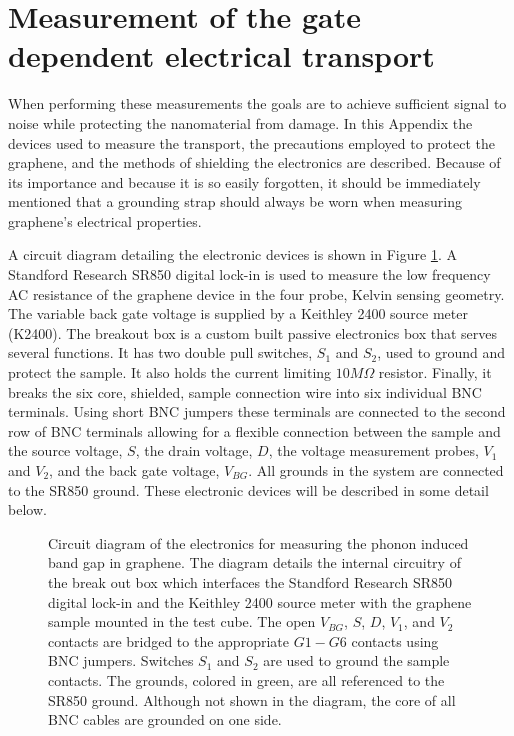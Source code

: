 \section{Measurement of the gate dependent electrical transport}
When performing these measurements the goals are to achieve sufficient signal to noise while protecting the nanomaterial from damage.
In this Appendix the devices used to measure the transport, the precautions employed to protect the graphene, and the methods of shielding the electronics are described.
Because of its importance and because it is so easily forgotten, it should be immediately mentioned that a grounding strap should always be worn when measuring graphene's electrical properties.

A circuit diagram detailing the electronic devices is shown in Figure \ref{fig:elec:wires}.
A Standford Research SR850 digital lock-in is used to measure the low frequency AC resistance of the graphene device in the four probe, Kelvin sensing geometry.
The variable back gate voltage is supplied by a Keithley 2400 source meter (K2400).
The breakout box is a custom built passive electronics box that serves several functions.
It has two double pull switches, $S_1$ and $S_2$, used to ground and protect the sample.
It also holds the current limiting $10 M \Omega$ resistor.
Finally, it breaks the six core, shielded, sample connection wire into six individual BNC terminals.
Using short BNC jumpers these terminals are connected to the second row of BNC terminals allowing for a flexible connection between the sample and the source voltage, $S$, the drain voltage, $D$, the voltage measurement probes, $V_1$ and $V_2$, and the back gate voltage, $V_{BG}$.
All grounds in the system are connected to the SR850 ground.
These electronic devices will be described in some detail below.

\begin{figure}
	\begin{center}
	
	\end{center}
	\caption[Circuit diagram for graphene electrical transport measurements]{\label{fig:elec:wires}
		Circuit diagram of the electronics for measuring the phonon induced band gap in graphene.
		The diagram details the internal circuitry of the break out box which interfaces the Standford Research SR850 digital lock-in and the Keithley 2400 source meter with the graphene sample mounted in the test cube.
		The open $V_{BG}$, $S$, $D$, $V_1$, and $V_2$ contacts are bridged to the appropriate $G1-G6$ contacts using BNC jumpers.
		Switches $S_1$ and $S_2$ are used to ground the sample contacts.
		The grounds, colored in green, are all referenced to the SR850 ground.
		Although not shown in the diagram, the core of all BNC cables are grounded on one side.
	}
\end{figure}

